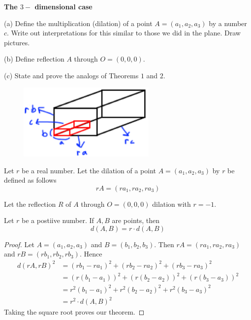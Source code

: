 \begin{tcolorbox}[title=Problem 4, breakable]
    \textbf{The $3-$ dimensional case}

    (a) Define the multiplication (dilation) of a point $A = (a_1, a_2, a_3)$
        by a number $c$. Write out interpretations for this similar to those 
        we did in the plane. Draw pictures.

    (b) Define reflection $A$ through $O = (0, 0, 0)$.

    (c) State and prove the analogs of Theorems $1$ and $2$.
\end{tcolorbox}
\begin{figure}[h]
    \centering
    \includegraphics[width=0.6\textwidth]{images/arb2_rect.png}
\end{figure}
\begin{definition}
    Let $r$ be a real number.
    Let the dilation of a point $A = (a_1, a_2, a_3)$ by $r$ be defined as follows
    \[r A = (r a_1, r a_2, r a_3)\]
\end{definition}
\begin{definition}
    Let the reflection $R$ of $A$ through $O = (0, 0, 0)$
    dilation with $r = -1$.
\end{definition}
\begin{theorem}
    Let $r$ be a postiive number. If $A, B$ are points, then 
    \[d(A, B) = r \cdot d(A, B)\]
\end{theorem}
\begin{proof}
    Let $A = (a_1, a_2, a_3)$ and $B = (b_1, b_2, b_3)$.
    Then $r A = (r a_1, r a_2, r a_3)$ and $r B = (r b_1, r b_2, r b_3)$.
    Hence 
    \begin{align*}
        d(r A, r B)^2 
            &= (r b_1 - r a_1)^2 + (r b_2 - r a_2)^2 + (r b_3 - r a_3)^2 \\
            &= (r (b_1 - a_1))^2 + (r (b_2 - a_2))^2 + (r (b_3 - a_3))^2 \\
            &= r^2(b_1 - a_1)^2 + r^2(b_2 - a_2)^2 + r^2(b_3 - a_3)^2 \\
            &= r^2 \cdot d(A, B)^2
    \end{align*}
    Taking the square root proves our theorem.
\end{proof}
